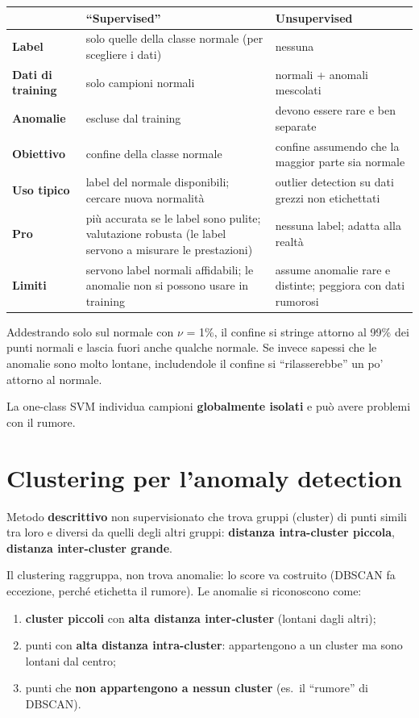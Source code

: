 \begin{center}
\small
\renewcommand{\arraystretch}{1.2}
\begin{tabularx}{\textwidth}{>{\bfseries}l X X}
\toprule
& ``Supervised'' & Unsupervised\\
\midrule
Label & solo quelle della classe normale (per scegliere i dati) & nessuna\\
Dati di training & solo campioni normali & normali + anomali mescolati\\
Anomalie & escluse dal training & devono essere rare e ben separate\\
Obiettivo & confine della classe normale & confine assumendo che la maggior parte sia normale\\
Uso tipico & label del normale disponibili; cercare nuova normalità & outlier detection su dati grezzi non etichettati\\
Pro & più accurata se le label sono pulite; valutazione robusta (le label servono a misurare le prestazioni) & nessuna label; adatta alla realtà\\
Limiti & servono label normali affidabili; le anomalie non si possono usare in training & assume anomalie rare e distinte; peggiora con dati rumorosi\\
\bottomrule
\end{tabularx}
\end{center}
\begin{esempio}
Addestrando solo sul normale con $\nu$ = 1\%, il confine si stringe attorno al 99\% dei punti normali e lascia fuori anche qualche normale.
Se invece sapessi che le anomalie sono molto lontane, includendole il confine si ``rilasserebbe'' un po' attorno al normale.
\end{esempio}
La one-class SVM individua campioni \textbf{globalmente isolati} e può avere problemi con il rumore.

\section{Clustering per l'anomaly detection}
\begin{definizione}[clustering]
Metodo \textbf{descrittivo} non supervisionato che trova gruppi (cluster) di punti simili tra loro e diversi da quelli degli altri gruppi:
\textbf{distanza intra-cluster piccola}, \textbf{distanza inter-cluster grande}.
\end{definizione}
Il clustering raggruppa, non trova anomalie: lo score va costruito (DBSCAN fa eccezione, perché etichetta il rumore). Le anomalie si
riconoscono come:
\begin{enumerate}
  \item \textbf{cluster piccoli} con \textbf{alta distanza inter-cluster} (lontani dagli altri);
  \item punti con \textbf{alta distanza intra-cluster}: appartengono a un cluster ma sono lontani dal centro;
  \item punti che \textbf{non appartengono a nessun cluster} (es.\ il ``rumore'' di DBSCAN).
\end{enumerate}

